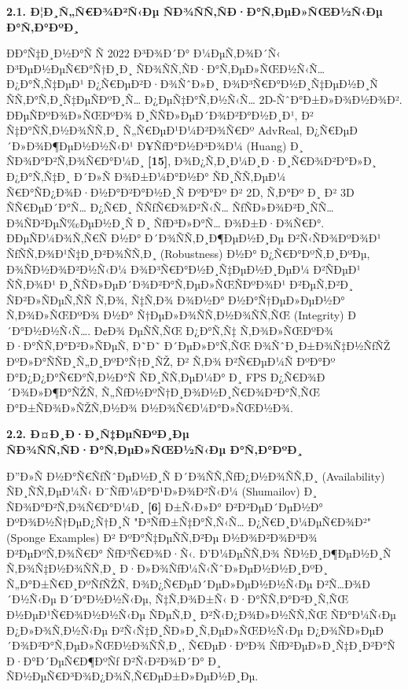 \documentclass[]{article}
\begin{document}
\textbf{2.1. Ð¦Ð¸Ñ„Ñ€Ð¾Ð²Ñ‹Ðµ ÑÐ¾ÑÑ‚ÑÐ·Ð°Ñ‚ÐµÐ»ÑŒÐ½Ñ‹Ðµ Ð°Ñ‚Ð°ÐºÐ¸}

ÐÐ°Ñ‡Ð¸Ð½Ð°Ñ Ñ 2022 Ð³Ð¾Ð´Ð° Ð¼ÐµÑ‚Ð¾Ð´Ñ‹ Ð³ÐµÐ½ÐµÑ€Ð°Ñ†Ð¸Ð¸ ÑÐ¾ÑÑ‚ÑÐ·Ð°Ñ‚ÐµÐ»ÑŒÐ½Ñ‹Ñ… Ð¿Ð°Ñ‚Ñ‡ÐµÐ¹ Ð¿Ñ€ÐµÐ²Ð·Ð¾ÑˆÐ»Ð¸ Ð¾Ð³Ñ€Ð°Ð½Ð¸Ñ‡ÐµÐ½Ð¸Ñ ÑÑ‚Ð°Ñ‚Ð¸Ñ‡ÐµÑÐºÐ¸Ñ… Ð¿ÐµÑ‡Ð°Ñ‚Ð½Ñ‹Ñ… 2D-ÑˆÐ°Ð±Ð»Ð¾Ð½Ð¾Ð². ÐÐµÑÐºÐ¾Ð»ÑŒÐºÐ¾ Ð¸ÑÑÐ»ÐµÐ´Ð¾Ð²Ð°Ð½Ð¸Ð¹, Ð² Ñ‡Ð°ÑÑ‚Ð½Ð¾ÑÑ‚Ð¸ Ñ„Ñ€ÐµÐ¹Ð¼Ð²Ð¾Ñ€Ðº AdvReal, Ð¿Ñ€ÐµÐ´Ð»Ð¾Ð¶ÐµÐ½Ð½Ñ‹Ð¹ Ð¥ÑƒÐ°Ð½Ð³Ð¾Ð¼ (Huang) Ð¸ ÑÐ¾Ð°Ð²Ñ‚Ð¾Ñ€Ð°Ð¼Ð¸ \textbf{{[}15{]}}, Ð¾Ð¿Ñ‚Ð¸Ð¼Ð¸Ð·Ð¸Ñ€Ð¾Ð²Ð°Ð»Ð¸ Ð¿Ð°Ñ‚Ñ‡Ð¸ Ð´Ð»Ñ Ð¾Ð±Ð¼Ð°Ð½Ð° ÑÐ¸ÑÑ‚ÐµÐ¼ Ñ€Ð°ÑÐ¿Ð¾Ð·Ð½Ð°Ð²Ð°Ð½Ð¸Ñ ÐºÐ°Ðº Ð² 2D, Ñ‚Ð°Ðº Ð¸ Ð² 3D ÑÑ€ÐµÐ´Ð°Ñ… Ð¿Ñ€Ð¸ ÑÑƒÑ€Ð¾Ð²Ñ‹Ñ… ÑƒÑÐ»Ð¾Ð²Ð¸ÑÑ… Ð¾ÑÐ²ÐµÑ‰ÐµÐ½Ð¸Ñ Ð¸ ÑƒÐ³Ð»Ð°Ñ… Ð¾Ð±Ð·Ð¾Ñ€Ð°. ÐÐµÑÐ¼Ð¾Ñ‚Ñ€Ñ Ð½Ð° Ð´Ð¾ÑÑ‚Ð¸Ð¶ÐµÐ½Ð¸Ðµ Ð²Ñ‹ÑÐ¾ÐºÐ¾Ð¹ ÑƒÑÑ‚Ð¾Ð¹Ñ‡Ð¸Ð²Ð¾ÑÑ‚Ð¸ (Robustness) Ð½Ð° Ð¿Ñ€Ð°ÐºÑ‚Ð¸ÐºÐµ, Ð¾ÑÐ½Ð¾Ð²Ð½Ñ‹Ð¼ Ð¾Ð³Ñ€Ð°Ð½Ð¸Ñ‡ÐµÐ½Ð¸ÐµÐ¼ Ð²ÑÐµÐ¹ ÑÑ‚Ð¾Ð¹ Ð¸ÑÑÐ»ÐµÐ´Ð¾Ð²Ð°Ñ‚ÐµÐ»ÑŒÑÐºÐ¾Ð¹ Ð²ÐµÑ‚Ð²Ð¸ ÑÐ²Ð»ÑÐµÑ‚ÑÑ Ñ‚Ð¾, Ñ‡Ñ‚Ð¾ Ð¾Ð½Ð° Ð½Ð°Ñ†ÐµÐ»ÐµÐ½Ð° Ñ‚Ð¾Ð»ÑŒÐºÐ¾ Ð½Ð° Ñ†ÐµÐ»Ð¾ÑÑ‚Ð½Ð¾ÑÑ‚ÑŒ (Integrity) Ð´Ð°Ð½Ð½Ñ‹Ñ…. Ð¢Ð¾ ÐµÑÑ‚ÑŒ Ð¿Ð°Ñ‚Ñ‡ Ñ‚Ð¾Ð»ÑŒÐºÐ¾ Ð·Ð°ÑÑ‚Ð°Ð²Ð»ÑÐµÑ‚ Ð˜Ð˜ Ð´ÐµÐ»Ð°Ñ‚ÑŒ Ð¾ÑˆÐ¸Ð±Ð¾Ñ‡Ð½ÑƒÑŽ ÐºÐ»Ð°ÑÑÐ¸Ñ„Ð¸ÐºÐ°Ñ†Ð¸ÑŽ, Ð² Ñ‚Ð¾ Ð²Ñ€ÐµÐ¼Ñ ÐºÐ°Ðº Ð°Ð¿Ð¿Ð°Ñ€Ð°Ñ‚Ð½Ð°Ñ ÑÐ¸ÑÑ‚ÐµÐ¼Ð° Ð¸ FPS Ð¿Ñ€Ð¾Ð´Ð¾Ð»Ð¶Ð°ÑŽÑ‚ Ñ„ÑƒÐ½ÐºÑ†Ð¸Ð¾Ð½Ð¸Ñ€Ð¾Ð²Ð°Ñ‚ÑŒ Ð°Ð±ÑÐ¾Ð»ÑŽÑ‚Ð½Ð¾ Ð½Ð¾Ñ€Ð¼Ð°Ð»ÑŒÐ½Ð¾.

\textbf{2.2. Ð¤Ð¸Ð·Ð¸Ñ‡ÐµÑÐºÐ¸Ðµ ÑÐ¾ÑÑ‚ÑÐ·Ð°Ñ‚ÐµÐ»ÑŒÐ½Ñ‹Ðµ Ð°Ñ‚Ð°ÐºÐ¸}

Ð”Ð»Ñ Ð½Ð°Ñ€ÑƒÑˆÐµÐ½Ð¸Ñ Ð´Ð¾ÑÑ‚ÑƒÐ¿Ð½Ð¾ÑÑ‚Ð¸ (Availability) ÑÐ¸ÑÑ‚ÐµÐ¼Ñ‹ Ð¨ÑƒÐ¼Ð°Ð¹Ð»Ð¾Ð²Ñ‹Ð¼ (Shumailov) Ð¸ ÑÐ¾Ð°Ð²Ñ‚Ð¾Ñ€Ð°Ð¼Ð¸ \textbf{{[}6{]}} Ð±Ñ‹Ð»Ð° Ð²Ð²ÐµÐ´ÐµÐ½Ð° ÐºÐ¾Ð½Ñ†ÐµÐ¿Ñ†Ð¸Ñ "Ð³ÑƒÐ±Ñ‡Ð°Ñ‚Ñ‹Ñ… Ð¿Ñ€Ð¸Ð¼ÐµÑ€Ð¾Ð²" (Sponge Examples) Ð² ÐºÐ°Ñ‡ÐµÑÑ‚Ð²Ðµ Ð½Ð¾Ð²Ð¾Ð³Ð¾ Ð²ÐµÐºÑ‚Ð¾Ñ€Ð° ÑƒÐ³Ñ€Ð¾Ð·Ñ‹. Ð’Ð¼ÐµÑÑ‚Ð¾ ÑÐ½Ð¸Ð¶ÐµÐ½Ð¸Ñ Ñ‚Ð¾Ñ‡Ð½Ð¾ÑÑ‚Ð¸ Ð·Ð»Ð¾ÑƒÐ¼Ñ‹ÑˆÐ»ÐµÐ½Ð½Ð¸ÐºÐ¸ Ñ„Ð°Ð±Ñ€Ð¸ÐºÑƒÑŽÑ‚ Ð¾Ð¿Ñ€ÐµÐ´ÐµÐ»ÐµÐ½Ð½Ñ‹Ðµ Ð²Ñ…Ð¾Ð´Ð½Ñ‹Ðµ Ð´Ð°Ð½Ð½Ñ‹Ðµ, Ñ‡Ñ‚Ð¾Ð±Ñ‹ Ð·Ð°ÑÑ‚Ð°Ð²Ð¸Ñ‚ÑŒ Ð½ÐµÐ¹Ñ€Ð¾Ð½Ð½Ñ‹Ðµ ÑÐµÑ‚Ð¸ Ð²Ñ‹Ð¿Ð¾Ð»Ð½ÑÑ‚ÑŒ ÑÐ°Ð¼Ñ‹Ðµ Ð¿Ð»Ð¾Ñ‚Ð½Ñ‹Ðµ Ð²Ñ‹Ñ‡Ð¸ÑÐ»Ð¸Ñ‚ÐµÐ»ÑŒÐ½Ñ‹Ðµ Ð¿Ð¾ÑÐ»ÐµÐ´Ð¾Ð²Ð°Ñ‚ÐµÐ»ÑŒÐ½Ð¾ÑÑ‚Ð¸, Ñ€ÐµÐ·ÐºÐ¾ ÑƒÐ²ÐµÐ»Ð¸Ñ‡Ð¸Ð²Ð°Ñ Ð·Ð°Ð´ÐµÑ€Ð¶ÐºÑƒ Ð²Ñ‹Ð²Ð¾Ð´Ð° Ð¸ ÑÐ½ÐµÑ€Ð³Ð¾Ð¿Ð¾Ñ‚Ñ€ÐµÐ±Ð»ÐµÐ½Ð¸Ðµ.
\end{document}
